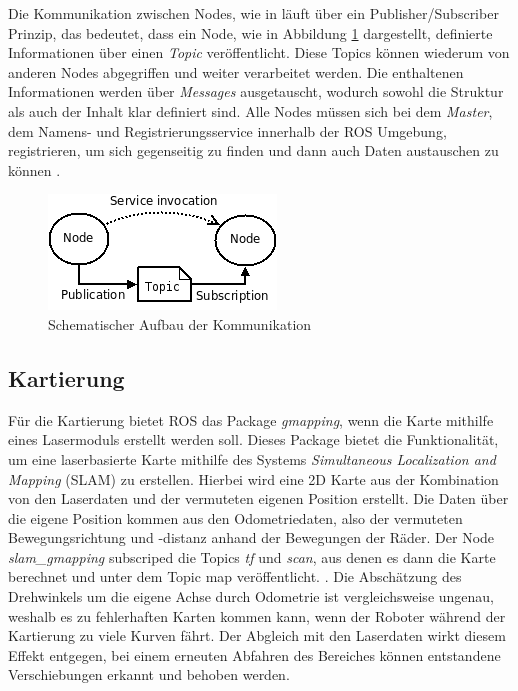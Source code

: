 \documentclass{scrartcl}%
\begin{document}
Die Kommunikation zwischen Nodes, wie in  läuft über ein Publisher/Subscriber Prinzip, das bedeutet, dass ein Node, wie in Abbildung \ref{concept} dargestellt, definierte Informationen über einen \textit{Topic} veröffentlicht. Diese Topics können wiederum von anderen Nodes abgegriffen und weiter verarbeitet werden. Die enthaltenen Informationen werden über \textit{Messages} ausgetauscht, wodurch sowohl die Struktur als auch der Inhalt klar definiert sind. Alle Nodes müssen sich bei dem \textit{Master}, dem Namens- und Registrierungsservice innerhalb der ROS Umgebung, registrieren, um sich gegenseitig zu finden und dann auch Daten austauschen zu können \cite{rosKonzept}.

\begin{figure}
	\centering
	\includegraphics{bilder/ROS_concepts.png}
	\caption{Schematischer Aufbau der Kommunikation \cite{rosKonzept}}
	\label{concept}
\end{figure}

\subsection{Kartierung}
\label{kartierung}
Für die Kartierung bietet ROS das Package \textit{gmapping}, wenn die Karte mithilfe eines Lasermoduls erstellt werden soll. Dieses Package bietet die Funktionalität, um eine laserbasierte Karte mithilfe des Systems \textit{Simultaneous Localization and Mapping} (SLAM) zu erstellen. Hierbei wird eine 2D Karte aus der Kombination von den Laserdaten und der vermuteten eigenen Position erstellt. Die Daten über die eigene Position kommen aus den Odometriedaten, also der vermuteten Bewegungsrichtung und -distanz anhand der Bewegungen der Räder. Der Node \textit{slam\_gmapping} subscriped die Topics \textit{tf} und \textit{scan}, aus denen es dann die Karte berechnet und unter dem Topic map veröffentlicht. \cite{gmap}. Die Abschätzung des Drehwinkels um die eigene Achse durch Odometrie ist vergleichsweise ungenau, weshalb es zu fehlerhaften Karten kommen kann, wenn der Roboter während der Kartierung zu viele Kurven fährt. Der Abgleich mit den Laserdaten wirkt diesem Effekt entgegen, bei einem erneuten Abfahren des Bereiches können entstandene Verschiebungen erkannt und behoben werden.
\end{document}
